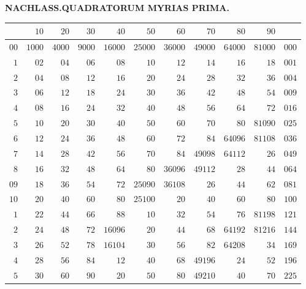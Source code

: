 \clearpage{}%
\renewcommand{\BookRunningTitle}{Quadratorum myrias prima}
\begin{center}\textbf{NACHLASS.\quad QUADRATORUM MYRIAS PRIMA.}\end{center}
\begingroup\fontsize{8.5}{10}\selectfont\setlength{\tabcolsep}{2pt}\renewcommand{\arraystretch}{1}
\begin{longtable}{@{}r|r|r|r|r|r|r|r|r|r|r@{}}
\hline
 & $10$ & $20$ & $30$ & $40$ & $50$ & $60$ & $70$ & $80$ & $90$ & \\
\hline\endhead
$00$ & $1000$ & $4000$ & $9000$ & $16000$ & $25000$ & $36000$ & $49000$ & $64000$ & $81000$ & $000$\\
$1$ & $02$ & $04$ & $06$ & $08$ & $10$ & $12$ & $14$ & $16$ & $18$ & $001$\\
$2$ & $04$ & $08$ & $12$ & $16$ & $20$ & $24$ & $28$ & $32$ & $36$ & $004$\\
$3$ & $06$ & $12$ & $18$ & $24$ & $30$ & $36$ & $42$ & $48$ & $54$ & $009$\\
$4$ & $08$ & $16$ & $24$ & $32$ & $40$ & $48$ & $56$ & $64$ & $72$ & $016$\\
$5$ & $10$ & $20$ & $30$ & $40$ & $50$ & $60$ & $70$ & $80$ & $81090$ & $025$\\
$6$ & $12$ & $24$ & $36$ & $48$ & $60$ & $72$ & $84$ & $64096$ & $81108$ & $036$\\
$7$ & $14$ & $28$ & $42$ & $56$ & $70$ & $84$ & $49098$ & $64112$ & $26$ & $049$\\
$8$ & $16$ & $32$ & $48$ & $64$ & $80$ & $36096$ & $49112$ & $28$ & $44$ & $064$\\
$09$ & $18$ & $36$ & $54$ & $72$ & $25090$ & $36108$ & $26$ & $44$ & $62$ & $081$\\
$10$ & $20$ & $40$ & $60$ & $80$ & $25100$ & $20$ & $40$ & $60$ & $80$ & $100$\\
$1$ & $22$ & $44$ & $66$ & $88$ & $10$ & $32$ & $54$ & $76$ & $81198$ & $121$\\
$2$ & $24$ & $48$ & $72$ & $16096$ & $20$ & $44$ & $68$ & $64192$ & $81216$ & $144$\\
$3$ & $26$ & $52$ & $78$ & $16104$ & $30$ & $56$ & $82$ & $64208$ & $34$ & $169$\\
$4$ & $28$ & $56$ & $84$ & $12$ & $40$ & $68$ & $49196$ & $24$ & $52$ & $196$\\
$5$ & $30$ & $60$ & $90$ & $20$ & $50$ & $80$ & $49210$ & $40$ & $70$ & $225$\\

\end{longtable}
